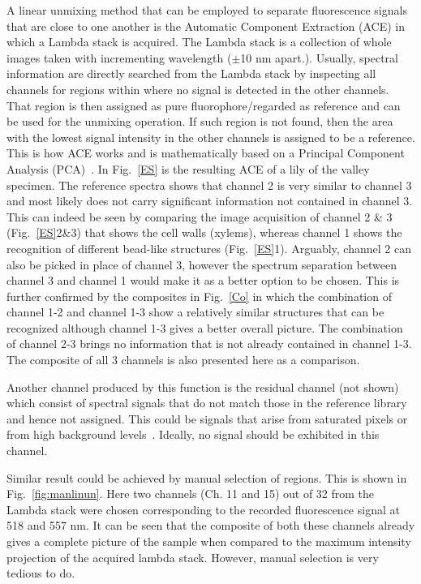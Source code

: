 A linear unmixing method that can be employed to separate fluorescence signals that are close to one another is the Automatic Component Extraction (ACE) in which a Lambda stack is acquired. 
The Lambda stack is a collection of whole images taken with incrementing wavelength ($\pm$10 nm apart.). 
Usually, spectral information are directly searched from the Lambda stack by inspecting all channels for regions within where no signal is detected in the other channels. 
That region is then assigned as pure fluorophore/regarded as reference and can be used for the unmixing operation. 
If such region is not found, then the area with the lowest signal intensity in the other channels is assigned to be a reference.
This is how ACE works and is mathematically based on a Principal Component Analysis (PCA)~\cite{ZeissCamp2}.
In Fig.~\ref{ES} is the resulting ACE of a lily of the valley specimen. 
The reference spectra shows that channel 2 is very similar to channel 3 and most likely does not carry significant information not contained in channel 3. 
This can indeed be seen by comparing the image acquisition of channel 2 \& 3 (Fig.~\ref{ES}2\&3) that shows the cell walls (xylems), whereas channel 1 shows the recognition of different bead-like structures (Fig.~\ref{ES}1). 
Arguably, channel 2 can also be picked in place of channel 3, however the spectrum separation between channel 3 and channel 1 would make it as a better option to be chosen. 
This is further confirmed by the composites in Fig.~\ref{Co} in which the combination of channel 1-2 and channel 1-3 show a relatively similar structures that can be recognized although channel 1-3 gives a better overall picture. 
The combination of channel 2-3 brings no information that is not already contained in channel 1-3. 
The composite of all 3 channels is also presented here as a comparison. 

Another channel produced by this function is the residual channel (not shown) which consist of spectral signals that do not match those in the reference library and hence not assigned. 
This could be signals that arise from saturated pixels or from high background levels~\cite{ZeissCamp2}. 
Ideally, no signal should be exhibited in this channel. 

Similar result could be achieved by manual selection of regions. 
This is shown in Fig.~\ref{fig:manlinun}. Here two channels (Ch. 11 and 15) out of 32 from the Lambda stack were chosen corresponding to the recorded fluorescence signal at 518 and 557 nm. 
It can be seen that the composite of both these channels already gives a complete picture of the sample when compared to the maximum intensity projection of the acquired lambda stack. 
However, manual selection is very tedious to do. 

